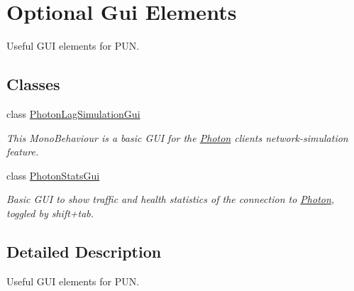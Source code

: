 \hypertarget{group__optional_gui}{}\section{Optional Gui Elements}
\label{group__optional_gui}


Useful G\+UI elements for P\+UN.  


\subsection*{Classes}
\begin{DoxyCompactItemize}
\item 
class \hyperlink{class_photon_lag_simulation_gui}{Photon\+Lag\+Simulation\+Gui}
\begin{DoxyCompactList}\small\item\em This Mono\+Behaviour is a basic G\+UI for the \hyperlink{namespace_photon}{Photon} client\textquotesingle{}s network-\/simulation feature. \end{DoxyCompactList}\item 
class \hyperlink{class_photon_stats_gui}{Photon\+Stats\+Gui}
\begin{DoxyCompactList}\small\item\em Basic G\+UI to show traffic and health statistics of the connection to \hyperlink{namespace_photon}{Photon}, toggled by shift+tab. \end{DoxyCompactList}\end{DoxyCompactItemize}


\subsection{Detailed Description}
Useful G\+UI elements for P\+UN. 

